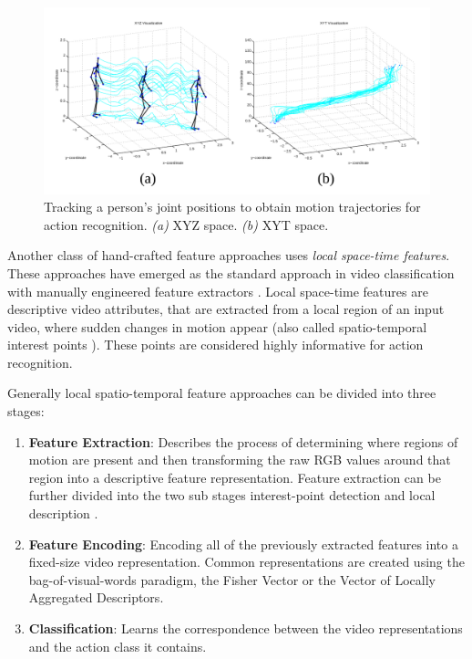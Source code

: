 \begin{figure}[H]
    \centering
    \includegraphics[width=\textwidth]{img_related/trajectories_sheikh}
    \caption{Tracking a person's joint positions to obtain motion trajectories for action recognition. \textit{(a)} XYZ space. \textit{(b)} XYT space. \cite{sheikh_exploring_2005}}
    \label{fig:trajectories_sheikh}
\end{figure}

Another class of hand-crafted feature approaches uses \textit{local space-time features}.
These approaches have emerged as the standard approach in video classification with manually engineered feature extractors \cite{karpathy_large-scale_2014}.
Local space-time features are descriptive video attributes, that are extracted from a local region of an input video, where sudden changes in motion appear (also called spatio-temporal interest points \cite{poppe_survey_2010}).
These points are considered highly informative for action recognition.

Generally local spatio-temporal feature approaches can be divided into three stages: \cite{karpathy_large-scale_2014}\cite{aggarwal_human_2011}
\begin{enumerate}
    \item \textbf{Feature Extraction}: Describes the process of determining where regions of motion are present and then transforming the raw RGB values around that region into a descriptive feature representation.
    Feature extraction can be further divided into the two sub stages interest-point detection and local description \cite{poppe_survey_2010}.
    \item \textbf{Feature Encoding}:
    Encoding all of the previously extracted features into a fixed-size video representation.
    Common representations are created using the bag-of-visual-words paradigm, the Fisher Vector\cite{perronnin_fisher_2007} or the Vector of Locally Aggregated Descriptors\cite{jegou_aggregating_2010}.
    \item \textbf{Classification}:
    Learns the correspondence between the video representations and the action class it contains.
\end{enumerate}

